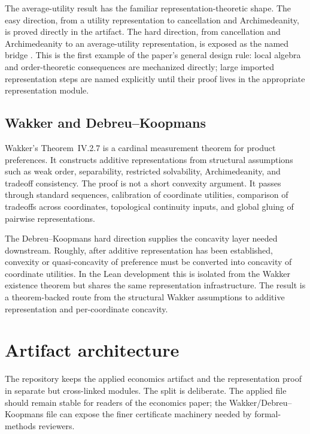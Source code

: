 \documentclass[11pt,english]{article}
\newcommand{\code}[1]{\texttt{\detokenize{#1}}}
\begin{document}
The average-utility result has the familiar representation-theoretic shape.  The easy direction, from a utility representation to cancellation and Archimedeanity, is proved directly in the artifact.  The hard direction, from cancellation and Archimedeanity to an average-utility representation, is exposed as the named bridge \code{AverageUtilityHardDirection}.  This is the first example of the paper's general design rule: local algebra and order-theoretic consequences are mechanized directly; large imported representation steps are named explicitly until their proof lives in the appropriate representation module.

\subsection{Wakker and Debreu--Koopmans}

Wakker's Theorem~IV.2.7 is a cardinal measurement theorem for product preferences.  It constructs additive representations from structural assumptions such as weak order, separability, restricted solvability, Archimedeanity, and tradeoff consistency.  The proof is not a short convexity argument.  It passes through standard sequences, calibration of coordinate utilities, comparison of tradeoffs across coordinates, topological continuity inputs, and global gluing of pairwise representations.

The Debreu--Koopmans hard direction supplies the concavity layer needed downstream.  Roughly, after additive representation has been established, convexity or quasi-concavity of preference must be converted into concavity of coordinate utilities.  In the Lean development this is isolated from the Wakker existence theorem but shares the same representation infrastructure.  The result is a theorem-backed route from the structural Wakker assumptions to additive representation and per-coordinate concavity.

\section{Artifact architecture}
\label{sec:artifact}

The repository keeps the applied economics artifact and the representation proof in separate but cross-linked modules.  The split is deliberate.  The applied file should remain stable for readers of the economics paper; the Wakker/Debreu--Koopmans file can expose the finer certificate machinery needed by formal-methods reviewers.
\end{document}
